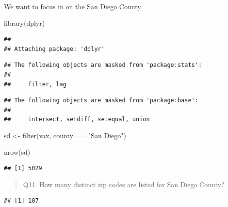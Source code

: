 \documentclass[
]{article}
\newenvironment{Shaded}{\begin{snugshade}}{\end{snugshade}}
\newcommand{\FunctionTok}[1]{\textcolor[rgb]{0.00,0.00,0.00}{#1}}
\newcommand{\NormalTok}[1]{#1}
\newcommand{\OtherTok}[1]{\textcolor[rgb]{0.56,0.35,0.01}{#1}}
\newcommand{\SpecialCharTok}[1]{\textcolor[rgb]{0.00,0.00,0.00}{#1}}
\newcommand{\StringTok}[1]{\textcolor[rgb]{0.31,0.60,0.02}{#1}}
\begin{document}
We want to focus in on the San Diego County

\begin{Shaded}
\begin{Highlighting}[]
\FunctionTok{library}\NormalTok{(dplyr)}
\end{Highlighting}
\end{Shaded}

\begin{verbatim}
## 
## Attaching package: 'dplyr'
\end{verbatim}

\begin{verbatim}
## The following objects are masked from 'package:stats':
## 
##     filter, lag
\end{verbatim}

\begin{verbatim}
## The following objects are masked from 'package:base':
## 
##     intersect, setdiff, setequal, union
\end{verbatim}

\begin{Shaded}
\begin{Highlighting}[]
\NormalTok{sd }\OtherTok{\textless{}{-}} \FunctionTok{filter}\NormalTok{(vax, county }\SpecialCharTok{==} \StringTok{"San Diego"}\NormalTok{)}
\end{Highlighting}
\end{Shaded}

\begin{Shaded}
\begin{Highlighting}[]
\FunctionTok{nrow}\NormalTok{(sd)}
\end{Highlighting}
\end{Shaded}

\begin{verbatim}
## [1] 5029
\end{verbatim}

\begin{quote}
Q11. How many distinct zip codes are listed for San Diego County?
\end{quote}

\begin{Shaded}
\end{Shaded}

\begin{verbatim}
## [1] 107
\end{verbatim}
\end{document}
